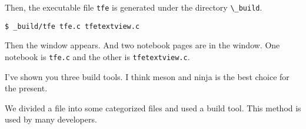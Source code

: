 Then, the executable file \passthrough{\lstinline!tfe!} is generated
under the directory \passthrough{\lstinline!\_build!}.

\begin{lstlisting}
$ _build/tfe tfe.c tfetextview.c
\end{lstlisting}

Then the window appears. And two notebook pages are in the window. One
notebook is \passthrough{\lstinline!tfe.c!} and the other is
\passthrough{\lstinline!tfetextview.c!}.

I've shown you three build tools. I think meson and ninja is the best
choice for the present.

We divided a file into some categorized files and used a build tool.
This method is used by many developers.
